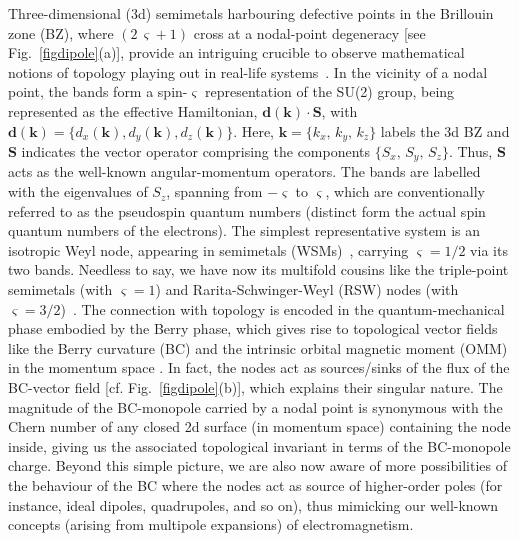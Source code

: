 \documentclass[aps,prb,onecolumn, footinbib, 10pt]{revtex4-2}
\begin{document}
Three-dimensional (3d) semimetals harbouring defective points in the Brillouin zone (BZ), where $(2\, \varsigma + 1)$ cross at a nodal-point degeneracy [see Fig.~\ref{figdipole}(a)], provide an intriguing crucible to observe mathematical notions of topology playing out in real-life systems~\cite{burkov11_Weyl,*hosur1, armitage_review, *hosur-review, *yan17_topological, ips-kush-review, bernevig, *bernevig2, grushin-multifold, claudia-multifold}. In the vicinity of a nodal point, the bands form a spin-$\varsigma$ representation of the SU(2) group, being represented as the effective Hamiltonian,
$ \boldsymbol d( \boldsymbol{k} ) \cdot \boldsymbol {S } $, with
$\boldsymbol d( \boldsymbol{k} ) = 
\lbrace d_x ( \boldsymbol{k} ) , d_y ( \boldsymbol{k} ) , d_z ( \boldsymbol{k} )  
 \rbrace.$
Here, $\mathbf k = \lbrace k_x, \,k_y, \,  k_z  \rbrace$ labels the 3d BZ and $\boldsymbol {S}$ indicates the vector operator comprising the components $ \lbrace S_x, \,S_y, \,  S_z  \rbrace $. Thus, $\boldsymbol {S}$ acts as the well-known angular-momentum operators. The bands are labelled with the eigenvalues of $S_z$, spanning from $- \varsigma $ to $ \varsigma $, which are conventionally referred to as the pseudospin quantum numbers (distinct form the actual spin quantum numbers of the electrons).
The simplest representative system is an isotropic Weyl node, appearing in semimetals (WSMs)~\cite{burkov11_Weyl, armitage_review, yan17_topological}, carrying $\varsigma = 1/2$ via its two bands. Needless to say, we have now its multifold cousins like the triple-point semimetals (with $\varsigma = 1 $) and Rarita-Schwinger-Weyl (RSW) nodes (with $\varsigma = 3/2$)~\cite{bernevig, long, isobe-fu, tang2017_multiple, ma2021_observation, prb108035428, grushin-multifold, ips-rsw-ph, *ips-shreya,*ips-exact-rsw}. The connection with topology is encoded in the quantum-mechanical phase embodied by the Berry phase, which gives rise to topological vector fields like the Berry curvature (BC) and the intrinsic orbital magnetic moment (OMM) in the momentum space \cite{xiao_review, *sundaram99_wavepacket, *graf-Nband}. In fact, the nodes act as sources/sinks of the flux of the BC-vector field [cf. Fig.~\ref{figdipole}(b)], which explains their singular nature. The magnitude of the BC-monopole carried by a nodal point is synonymous with the Chern number of any closed 2d surface (in momentum space) containing the node inside, giving us the associated topological invariant in terms of the BC-monopole charge. Beyond this simple picture, we are also now aware of more possibilities of the behaviour of the BC where the nodes act as source of higher-order poles \cite{twoband-dipole, graf-hopf, hopf2, *hopf3} (for instance, ideal dipoles, quadrupoles, and so on), thus mimicking our well-known concepts (arising from multipole expansions) of electromagnetism.
\end{document}
